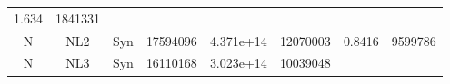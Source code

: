 \documentclass[]{article}
\begin{document}
\begin{longtable}[]{@{}cccccccc@{}}
\begin{minipage}[t]{0.08\columnwidth}
1.634
\strut\end{minipage} &
\begin{minipage}[t]{0.12\columnwidth}\centering\strut
1841331
\strut\end{minipage}\tabularnewline
\begin{minipage}[t]{0.07\columnwidth}\centering\strut
N
\strut\end{minipage} &
\begin{minipage}[t]{0.07\columnwidth}\centering\strut
NL2
\strut\end{minipage} &
\begin{minipage}[t]{0.11\columnwidth}\centering\strut
Syn
\strut\end{minipage} &
\begin{minipage}[t]{0.11\columnwidth}\centering\strut
17594096
\strut\end{minipage} &
\begin{minipage}[t]{0.11\columnwidth}\centering\strut
4.371e+14
\strut\end{minipage} &
\begin{minipage}[t]{0.11\columnwidth}\centering\strut
12070003
\strut\end{minipage} &
\begin{minipage}[t]{0.08\columnwidth}\centering\strut
0.8416
\strut\end{minipage} &
\begin{minipage}[t]{0.12\columnwidth}\centering\strut
9599786
\strut\end{minipage}\tabularnewline
\begin{minipage}[t]{0.07\columnwidth}\centering\strut
N
\strut\end{minipage} &
\begin{minipage}[t]{0.07\columnwidth}\centering\strut
NL3
\strut\end{minipage} &
\begin{minipage}[t]{0.11\columnwidth}\centering\strut
Syn
\strut\end{minipage} &
\begin{minipage}[t]{0.11\columnwidth}\centering\strut
16110168
\strut\end{minipage} &
\begin{minipage}[t]{0.11\columnwidth}\centering\strut
3.023e+14
\strut\end{minipage} &
\begin{minipage}[t]{0.11\columnwidth}\centering\strut
10039048
\strut\end{minipage} &
\begin{minipage}[t]{0.08\columnwidth}\centering\strut

\end{minipage}
\end{longtable}
\end{document}
